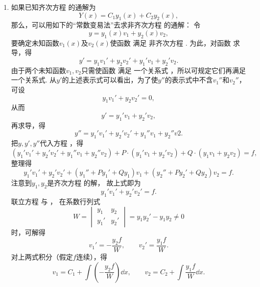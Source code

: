 \begin{enumerate}
\item%
如果已知齐次方程  的通解为\[
Y(x) = C_1 y_1(x) + C_2 y_2(x),
\]那么，可以用如下的“常数变易法”去求非齐次方程  的通解：
令\begin{equation}\label{equation:微分方程.二阶非齐次线性微分方程的通解设想}
y = y_1(x) v_1 + y_2(x) v_2,
\end{equation}
要确定未知函数\(v_1(x)\)及\(v_2(x)\)使函数  满足%
非齐次方程 .
为此，对函数  求导，得\[
y' = y_1 v_1' + y_2 v_2' + y_1' v_1 + y_2' v_2.
\]
由于两个未知函数\(v_1,v_2\)只需使函数  满足%
一个关系式 ，所以可规定它们再满足一个关系式.
从\(y'\)的上述表示式可以看出，为了使\(y''\)的表示式中不含\(v_1''\)和\(v_2''\)，可设\begin{equation}\label{equation:微分方程.二阶非齐次线性微分方程的额外条件1}
y_1 v_1' + y_2 v_2' = 0,
\end{equation}从而\[
y' = y_1' v_1 + y_2' v_2,
\]再求导，得\[
y'' = y_1' v_1' + y_2' v_2' + y_1'' v_1 + y_2'' v2.
\]把\(y,y',y''\)代入方程 ，得\[
(y_1' v_1' + y_2' v_2' + y_1'' v_1 + y_2'' v_2)
+P\cdot(y_1' v_1 + y_2' v_2) + Q\cdot(y_1 v_1 + y_2 v_2) = f,
\]整理得\[
y_1' v_1' + y_2' v_2'
+ (y_1'' + P y_1' + Q y_1) v_1
+ (y_2'' + P y_2' + Q y_2) v_2
= f.
\]注意到\(y_1,y_2\)是齐次方程  的解，
故上式即为
\begin{equation}\label{equation:微分方程.二阶非齐次线性微分方程的额外条件2}
y_1' v_1' + y_2' v_2' = f.
\end{equation}
联立方程  与 ，
在系数行列式\[
W = \begin{vmatrix} y_1 & y_2 \\ y_1' & y_2' \end{vmatrix}
= y_1 y_2' - y_1 y_2 \neq0
\]时，可解得\[
v_1' = -\frac{y_2 f}{W},
\qquad
v_2' = \frac{y_1 f}{W}.
\]
对上两式积分（假定\(f\)连续），得\[
v_1 = C_1 + \int \left(-\frac{y_2 f}{W}\right) \dd{x},
\qquad
v_2 = C_2 + \int \frac{y_1 f}{W} \dd{x}.
\]


\end{enumerate}
